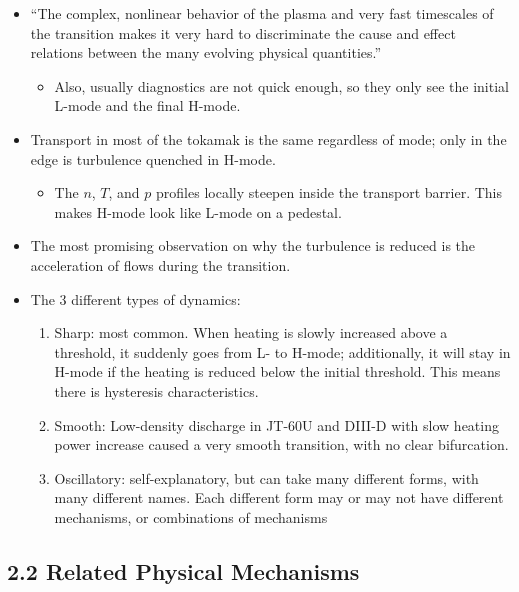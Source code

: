 \documentclass[a4paper]{article}
\begin{document}
\begin{itemize}
\item
  ``The complex, nonlinear behavior of the plasma and very fast
  timescales of the transition makes it very hard to discriminate the
  cause and effect relations between the many evolving physical
  quantities.''

  \begin{itemize}
  \itemsep1pt\parskip0pt
  \item
    Also, usually diagnostics are not quick enough, so they only see the
    initial L-mode and the final H-mode.
  \end{itemize}
\item
  Transport in most of the tokamak is the same regardless of mode; only
  in the edge is turbulence quenched in H-mode.

  \begin{itemize}
  \itemsep1pt\parskip0pt
  \item
    The $n$, $T$, and $p$ profiles locally steepen inside the transport
    barrier. This makes H-mode look like L-mode on a pedestal.
  \end{itemize}
\item
  The most promising observation on why the turbulence is reduced is the
  acceleration of flows during the transition.
\item
  The 3 different types of dynamics:

  \begin{enumerate}
  \def\labelenumi{\arabic{enumi}.}
  \item
    Sharp: most common. When heating is slowly increased above a
    threshold, it suddenly goes from L- to H-mode; additionally, it will
    stay in H-mode if the heating is reduced below the initial
    threshold. This means there is hysteresis characteristics.
  \item
    Smooth: Low-density discharge in JT-60U and DIII-D with slow heating
    power increase caused a very smooth transition, with no clear
    bifurcation.
  \item
    Oscillatory: self-explanatory, but can take many different forms,
    with many different names. Each different form may or may not have
    different mechanisms, or combinations of mechanisms
  \end{enumerate}
\end{itemize}

\subsection{2.2 Related Physical
Mechanisms}\label{related-physical-mechanisms}
\end{document}
